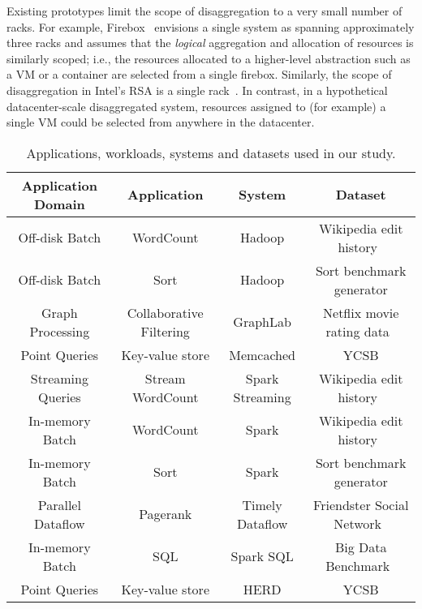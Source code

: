  Existing prototypes limit the scope of disaggregation to a very small number of racks. For example, Firebox~\cite{firebox} envisions a single system as spanning approximately three racks and assumes that the \emph{logical} aggregation and allocation of resources is similarly scoped; i.e., the resources allocated to a higher-level abstraction such as a VM or a container are selected from a single firebox. Similarly, the scope of disaggregation in Intel's RSA is a single rack~\cite{rsa}. In contrast, in a hypothetical datacenter-scale disaggregated system, resources assigned to (for example) a single VM could be selected from anywhere in the datacenter.  
%
\begin{table*}[t]
  \centering
  \small
  \begin{tabular}{c|c|c|c}
		\textbf{Application Domain} & \textbf{Application} & \textbf{System} & \textbf{Dataset} \\\hline \hline
		
    Off-disk Batch & WordCount & Hadoop & Wikipedia edit history~\cite{wikipedia}\\
     Off-disk Batch & Sort & Hadoop & Sort benchmark generator\\
     Graph Processing & Collaborative Filtering & GraphLab & Netflix movie rating data~\cite{netflix}\\
    Point Queries & Key-value store & Memcached & YCSB\\
    Streaming Queries & Stream WordCount & Spark Streaming & Wikipedia edit history~\cite{wikipedia}\\
    \hline
     \hline
     
    In-memory Batch & WordCount & Spark & Wikipedia edit history~\cite{wikipedia}\\
     In-memory Batch & Sort & Spark & Sort benchmark generator\\
     Parallel Dataflow & Pagerank & Timely Dataflow & Friendster Social Network~\cite{friendster}\\
     In-memory Batch & SQL & Spark SQL & Big Data Benchmark~\cite{bdb}\\
     Point Queries & Key-value store & HERD & YCSB\\\hline

    \hline
  \end{tabular}
  \vspace{0.1in}
  \caption{\small{Applications, workloads, systems and datasets used in our study.}}
  \label{tab:workloads}
\end{table*}
%

